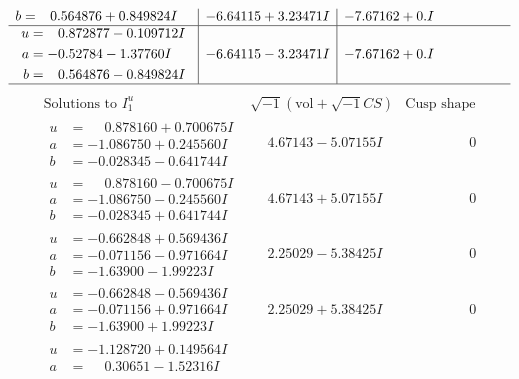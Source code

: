 \documentclass[1p]{elsarticle_modified}
\theoremstyle{definition}
\newcommand{\I}{\sqrt{-1}}
\begin{document}
$$\begin{array}{c|c|c}
\begin{aligned}
b &= \phantom{-}0.564876 + 0.849824 I\end{aligned}
 & -6.64115 + 3.23471 I & -7.67162 + 0. I\phantom{ +0.000000I} \\ \hline\begin{aligned}
u &= \phantom{-}0.872877 - 0.109712 I \\
a &= -0.52784 - 1.37760 I \\
b &= \phantom{-}0.564876 - 0.849824 I\end{aligned}
 & -6.64115 - 3.23471 I & -7.67162 + 0. I\phantom{ +0.000000I}\\
 \hline 
 \end{array}$$\newpage$$\begin{array}{c|c|c}  
\text{Solutions to }I^u_{1}& \I (\text{vol} + \sqrt{-1}CS) & \text{Cusp shape}\\
 \hline 
\begin{aligned}
u &= \phantom{-}0.878160 + 0.700675 I \\
a &= -1.086750 + 0.245560 I \\
b &= -0.028345 - 0.641744 I\end{aligned}
 & \phantom{-}4.67143 - 5.07155 I & \phantom{-0.000000 } 0 \\ \hline\begin{aligned}
u &= \phantom{-}0.878160 - 0.700675 I \\
a &= -1.086750 - 0.245560 I \\
b &= -0.028345 + 0.641744 I\end{aligned}
 & \phantom{-}4.67143 + 5.07155 I & \phantom{-0.000000 } 0 \\ \hline\begin{aligned}
u &= -0.662848 + 0.569436 I \\
a &= -0.071156 - 0.971664 I \\
b &= -1.63900 - 1.99223 I\end{aligned}
 & \phantom{-}2.25029 - 5.38425 I & \phantom{-0.000000 } 0 \\ \hline\begin{aligned}
u &= -0.662848 - 0.569436 I \\
a &= -0.071156 + 0.971664 I \\
b &= -1.63900 + 1.99223 I\end{aligned}
 & \phantom{-}2.25029 + 5.38425 I & \phantom{-0.000000 } 0 \\ \hline\begin{aligned}
u &= -1.128720 + 0.149564 I \\
a &= \phantom{-}0.30651 - 1.52316 I \\

\end{aligned}
\end{array}$$
\end{document}
